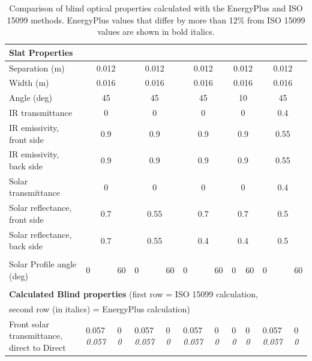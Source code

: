 \begin{longtable}[c]{p{1.0in}p{0.4in}p{0.4in}p{0.4in}p{0.4in}p{0.4in}p{0.4in}p{0.4in}p{0.4in}p{0.4in}p{0.4in}}
\caption{Comparison of blind optical properties calculated with the EnergyPlus and ISO 15099 methods. EnergyPlus values that differ by more than 12\% from ISO 15099 values are shown in bold italics. \label{table:comparison-of-blind-optical-properties}} \tabularnewline
\toprule
\multicolumn{11}{l}{\textbf{Slat Properties}} \tabularnewline
\midrule
\endfirsthead

Separation (m) & \multicolumn{2}{c}{0.012} & \multicolumn{2}{c}{0.012} & \multicolumn{2}{c}{0.012} & \multicolumn{2}{c}{0.012} & \multicolumn{2}{c}{0.012} \tabularnewline
Width (m) & \multicolumn{2}{c}{0.016} & \multicolumn{2}{c}{0.016} & \multicolumn{2}{c}{0.016} & \multicolumn{2}{c}{0.016} & \multicolumn{2}{c}{0.016} \tabularnewline
Angle (deg) & \multicolumn{2}{c}{45} & \multicolumn{2}{c}{45} & \multicolumn{2}{c}{45} & \multicolumn{2}{c}{10} & \multicolumn{2}{c}{45} \tabularnewline
IR transmittance & \multicolumn{2}{c}{0} & \multicolumn{2}{c}{0} & \multicolumn{2}{c}{0} & \multicolumn{2}{c}{0} & \multicolumn{2}{c}{0.4} \tabularnewline
IR emissivity, front side & \multicolumn{2}{c}{0.9} & \multicolumn{2}{c}{0.9} & \multicolumn{2}{c}{0.9} & \multicolumn{2}{c}{0.9} & \multicolumn{2}{c}{0.55} \tabularnewline
IR emissivity, back side & \multicolumn{2}{c}{0.9} & \multicolumn{2}{c}{0.9} & \multicolumn{2}{c}{0.9} & \multicolumn{2}{c}{0.9} & \multicolumn{2}{c}{0.55} \tabularnewline
Solar transmittance & \multicolumn{2}{c}{0} & \multicolumn{2}{c}{0} & \multicolumn{2}{c}{0} & \multicolumn{2}{c}{0} & \multicolumn{2}{c}{0.4} \tabularnewline
Solar reflectance, front side & \multicolumn{2}{c}{0.7} & \multicolumn{2}{c}{0.55} & \multicolumn{2}{c}{0.7} & \multicolumn{2}{c}{0.7} & \multicolumn{2}{c}{0.5} \tabularnewline
Solar reflectance, back side & \multicolumn{2}{c}{0.7} & \multicolumn{2}{c}{0.55} & \multicolumn{2}{c}{0.4} & \multicolumn{2}{c}{0.4} & \multicolumn{2}{c}{0.5} \tabularnewline \midrule
 \tabularnewline \midrule
Solar Profile angle (deg) & 0 & 60 & 0 & 60 & 0 & 60 & 0 & 60 & 0 & 60 \tabularnewline \midrule
 \tabularnewline \midrule
\multicolumn{11}{l}{\textbf{Calculated Blind properties} (first row = ISO 15099 calculation,} \tabularnewline
\multicolumn{11}{l}{second row (in italics) = EnergyPlus calculation)} \tabularnewline \midrule
Front solar transmittance, direct to Direct & 0.057 \quad \quad \textit{0.057} & 0 \quad \quad \textit{0} & 0.057 \quad \quad \textit{0.057} & 0 \quad \quad \textit{0} & 0.057 \quad \quad \textit{0.057} & 0 \quad \quad \textit{0} & 0 \quad \quad \textit{0} & 0 \quad \quad \textit{0} & 0.057 \quad \quad \textit{0.057} & 0 \quad \quad \textit{0} \tabularnewline

\end{longtable}
